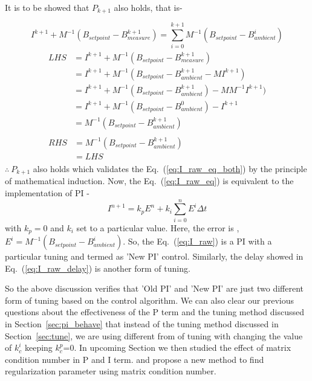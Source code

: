 It is to be showed that $P_{k+1}$ also holds, that is-

\begin{equation}\label{eq:I_raw_98}
   I^{k+1}+M^{-1} (B_{setpoint}-B_{measure}^{k+1})= \sum_{i=0}^{k+1} M^{-1} (B_{setpoint}-B_{ambient}^i)
\end{equation}
\begin{align*}
    \begin{split}
      LHS &=I^{k+1}+M^{-1} (B_{setpoint}-B_{measure}^{k+1}) \\
        &=I^{k+1}+M^{-1} (B_{setpoint}-B_{ambient}^{k+1} -M I^{k+1}) \\
        &=I^{k+1}+M^{-1} (B_{setpoint}-B_{ambient}^{k+1}) - MM^{-1} I^{k+1}) \\
        &=I^{k+1}+M^{-1} (B_{setpoint}-B_{ambient}^0) - I^{k+1} \\
        &=M^{-1} (B_{setpoint}-B_{ambient}^{k+1})
    \end{split}
    \\
    \begin{split}
      RHS &=M^{-1} (B_{setpoint}-B_{ambient}^{k+1})\\
          &= LHS
    \end{split}
\end{align*}
$\therefore \: P_{k+1}$ also holds which validates the Eq.~(\ref{eq:I_raw_eq_both}) by the principle of mathematical induction. \newline
Now, the Eq.~(\ref{eq:I_raw_eq}) is equivalent to the implementation of PI -
\begin{equation}\label{eq:I_raw_pi}
    I^{n+1}= k_p E^n+ k_i \sum_{i=0}^n E^i \Delta t
\end{equation}
with $k_p=0$ and $k_i$ set to a particular value. Here, the error is , $E^i=M^{-1} (B_{setpoint}-B_{ambient}^i)$. So, the Eq.~(\ref{eq:I_raw}) is a PI with a particular tuning and termed as 'New PI' control. Similarly, the delay showed in Eq.~(\ref{eq:I_raw_delay}) is another form of tuning.

So the above discussion verifies that 'Old PI' and 'New PI' are just two different form of tuning based on the control algorithm. We can also clear our previous questions about the effectiveness of the P term and the tuning method discussed in Section~\ref{sec:pi_behave} that instead of the tuning method discussed in Section~\ref{sec:tune}, we are using different from of tuning with changing the value of $k_c^i$ keeping $k_c^p$=0. In upcoming Section we then studied the effect of  matrix condition number in P and I term. and propose a new method to find regularization parameter using matrix condition number. 





